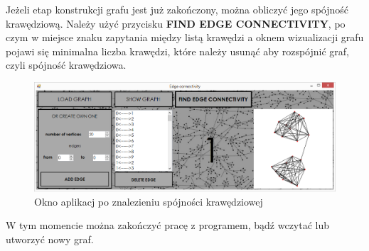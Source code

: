 \documentclass{article}
\begin{document}
Jeżeli etap konstrukcji grafu jest już zakończony, można obliczyć jego spójność krawędziową. Należy użyć przycisku \textbf{FIND EDGE CONNECTIVITY}, po czym w miejsce znaku zapytania między listą krawędzi a oknem wizualizacji grafu pojawi się minimalna liczba krawędzi, które należy usunąć aby rozspójnić graf, czyli spójność krawędziowa.
 
\begin{figure}[H]
\centering
\includegraphics[scale=0.4]{04}
\caption{Okno aplikacj po znalezieniu spójności krawędziowej}
\end{figure}

W tym momencie można zakończyć pracę z programem, bądź wczytać lub utworzyć nowy graf.
\end{document}
